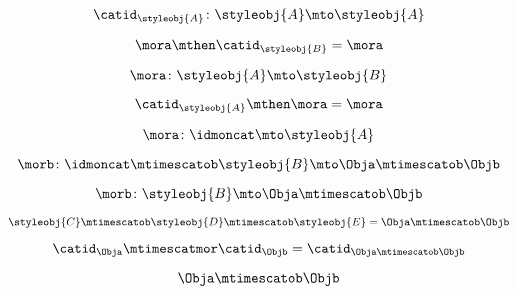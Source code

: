 {\begin{forslides}
        \begin{equation}
            \label{eq:parallelism-085}
            \catid_\styleobj{A} \colon \styleobj{A} \mto \styleobj{A}
        \end{equation}

        \begin{equation}
            \label{eq:parallelism-086}
            \mora \mthen \catid_\styleobj{B} = \mora
        \end{equation}

        \begin{equation}
            \label{eq:parallelism-087}
            \mora \colon \styleobj{A} \mto \styleobj{B}
        \end{equation}

        \begin{equation}
            \label{eq:parallelism-088}
            \catid_\styleobj{A} \mthen \mora  = \mora
        \end{equation}

        \begin{equation}
            \label{eq:parallelism-089}
            \mora \colon \idmoncat \mto \styleobj{A}
        \end{equation}

        \begin{equation}
            \label{eq:parallelism-090}
            \morb \colon \idmoncat \mtimescatob \styleobj{B} \mto \Obja \mtimescatob \Objb
        \end{equation}

        \begin{equation}
            \label{eq:parallelism-091}
            \morb \colon \styleobj{B} \mto \Obja \mtimescatob \Objb
        \end{equation}

        \begin{equation}
            \label{eq:parallelism-092}
            \styleobj{C} \mtimescatob \styleobj{D} \mtimescatob \styleobj{E} = \Obja \mtimescatob \Objb
        \end{equation}

        \begin{equation}
            \label{eq:parallelism-093}
            \catid_{\Obja} \mtimescatmor \catid_{\Objb} = \catid_{\Obja \mtimescatob \Objb}
        \end{equation}

        \begin{equation}
            \label{eq:parallelism-094}
            \Obja \mtimescatob \Objb
        \end{equation}


\end{forslides}}
